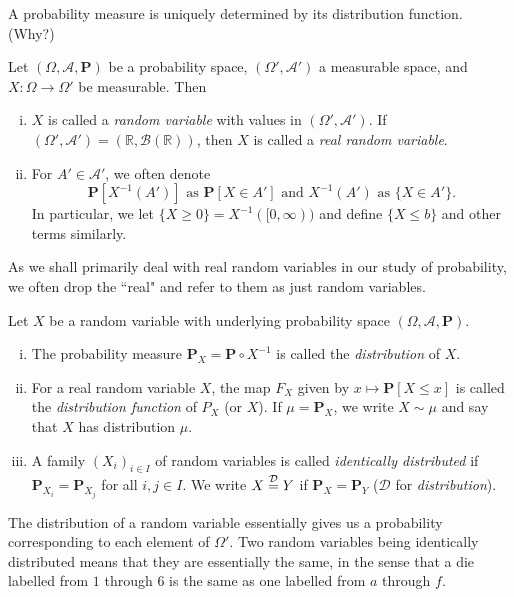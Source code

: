 A probability measure is uniquely determined by its distribution function. (Why?)

\begin{definition}
    Let $(\Omega,\mathcal{A},\textbf{P})$ be a probability space, $(\Omega',\mathcal{A}')$ a measurable space, and $X:\Omega\to\Omega'$ be measurable. Then
    \begin{enumerate}[(i)]
        \item $X$ is called a \textit{random variable} with values in $(\Omega',\mathcal{A}')$. If $(\Omega',\mathcal{A}')=(\mathbb{R},\mathcal{B}(\mathbb{R}))$, then $X$ is called a \textit{real random variable}.
        
        \item For $A'\in\mathcal{A}'$, we often denote
        $$\textbf{P}[X^{-1}(A')]\text{ as }\textbf{P}[X\in A']\text{ and } X^{-1}(A')\text{ as }\{X\in A'\}.$$
        In particular, we let $\{X\geq 0\}=X^{-1}([0,\infty))$ and define $\{X\leq b\}$ and other terms similarly.
    \end{enumerate}
\end{definition}

As we shall primarily deal with real random variables in our study of probability, we often drop the ``real" and refer to them as just random variables.

\begin{definition}
    Let $X$ be a random variable with underlying probability space $(\Omega,\mathcal{A},\textbf{P})$.
    \begin{enumerate}[(i)]
        \item The probability measure $\textbf{P}_X=\textbf{P}\circ X^{-1}$ is called the \textit{distribution} of $X$.
        \item For a real random variable $X$, the map $F_X$ given by $x\mapsto\textbf{P}[X\leq x]$ is called the \textit{distribution function} of $P_X$ (or $X$). If $\mu=\textbf{P}_X$, we write $X\sim\mu$ and say that $X$ has distribution $\mu$.
        \item A family $(X_i)_{i\in I}$ of random variables is called \textit{identically distributed} if $\textbf{P}_{X_i}=\textbf{P}_{X_j}$ for all $i,j\in I$. We write $X\stackrel{\mathcal{D}}{=} Y$ if $\textbf{P}_X=\textbf{P}_Y$ ($\mathcal{D}$ for \textit{distribution}).
    \end{enumerate}
\end{definition}

The distribution of a random variable essentially gives us a probability corresponding to each element of $\Omega'$. Two random variables being identically distributed means that they are essentially the same, in the sense that a die labelled from $1$ through $6$ is the same as one labelled from $a$ through $f$.

